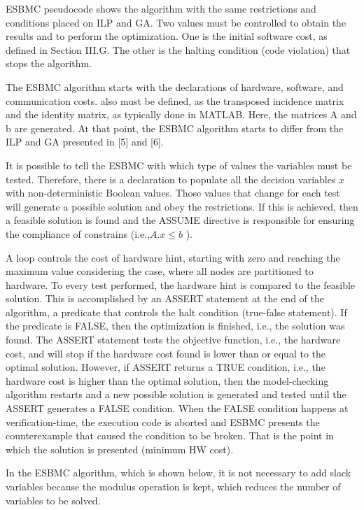ESBMC pseudocode shows the algorithm with the same restrictions and conditions placed on ILP and GA. Two values must be controlled to obtain the results and to perform the optimization. One is the initial software cost, as defined in Section III.G. The other is the halting condition (code violation) that stops the algorithm.

The ESBMC algorithm starts with the declarations of hardware, software, and communication costs.  also must be defined, as the transposed incidence matrix and the identity matrix, as typically done in MATLAB. Here, the matrices A and b are generated. At that point, the ESBMC algorithm starts to differ from the ILP and GA presented in [5] and [6].

It is possible to tell the ESBMC with which type of values the variables must be tested. Therefore, there is a declaration to populate all the decision variables $ x $ with non-deterministic Boolean values. Those values that change for each test will generate a possible solution and obey the restrictions. If this is achieved, then a feasible solution is found and the ASSUME directive is responsible for ensuring the compliance of constrains (i.e.,$ A.x \leq b $ ).

A loop controls the cost of hardware hint, starting with zero and reaching the maximum value considering the case, where all nodes are partitioned to hardware. To every test performed, the hardware hint is compared to the feasible solution. This is accomplished by an ASSERT statement at the end of the algorithm, a predicate that controls the halt condition (true-false statement). If the predicate is FALSE, then the optimization is finished, i.e., the solution was found. The ASSERT statement tests the objective function, i.e., the hardware cost, and will stop if the hardware cost found is lower than or equal to the optimal solution. However, if ASSERT returns a TRUE condition, i.e., the hardware cost is higher than the optimal solution, then the model-checking algorithm restarts and a new possible solution is generated and tested until the ASSERT generates a FALSE condition. When the FALSE condition happens at verification-time, the execution code is aborted and ESBMC presents the counterexample that caused the condition to be broken. That is the point in which the solution is presented (minimum HW cost).

In the ESBMC algorithm, which is shown below, it is not necessary to add slack variables because the modulus operation is kept, which reduces the number of variables to be solved. 

